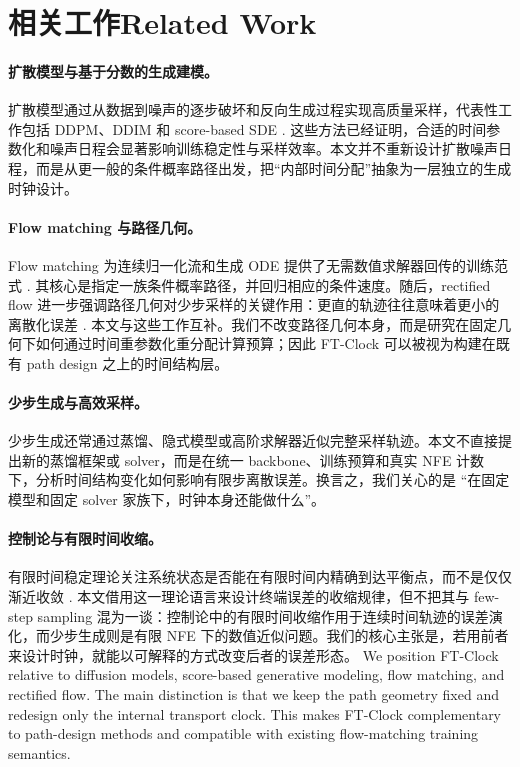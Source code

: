 \section{\ifinternalcn 相关工作\else Related Work\fi}

\ifinternalcn
\paragraph{扩散模型与基于分数的生成建模。}
扩散模型通过从数据到噪声的逐步破坏和反向生成过程实现高质量采样，代表性工作包括 DDPM、DDIM 和 score-based SDE \citep{ho2020ddpm,song2021ddim,song2021score}. 这些方法已经证明，合适的时间参数化和噪声日程会显著影响训练稳定性与采样效率。本文并不重新设计扩散噪声日程，而是从更一般的条件概率路径出发，把“内部时间分配”抽象为一层独立的生成时钟设计。

\paragraph{Flow matching 与路径几何。}
Flow matching 为连续归一化流和生成 ODE 提供了无需数值求解器回传的训练范式 \citep{lipman2023flowmatching}. 其核心是指定一族条件概率路径，并回归相应的条件速度。随后，rectified flow 进一步强调路径几何对少步采样的关键作用：更直的轨迹往往意味着更小的离散化误差 \citep{liu2022rectified}. 本文与这些工作互补。我们不改变路径几何本身，而是研究在固定几何下如何通过时间重参数化重分配计算预算；因此 FT-Clock 可以被视为构建在既有 path design 之上的时间结构层。

\paragraph{少步生成与高效采样。}
少步生成还常通过蒸馏、隐式模型或高阶求解器近似完整采样轨迹。本文不直接提出新的蒸馏框架或 solver，而是在统一 backbone、训练预算和真实 NFE 计数下，分析时间结构变化如何影响有限步离散误差。换言之，我们关心的是 ``在固定模型和固定 solver 家族下，时钟本身还能做什么''。

\paragraph{控制论与有限时间收缩。}
有限时间稳定理论关注系统状态是否能在有限时间内精确到达平衡点，而不是仅仅渐近收敛 \citep{bhat2000finite}. 本文借用这一理论语言来设计终端误差的收缩规律，但不把其与 few-step sampling 混为一谈：控制论中的有限时间收缩作用于连续时间轨迹的误差演化，而少步生成则是有限 NFE 下的数值近似问题。我们的核心主张是，若用前者来设计时钟，就能以可解释的方式改变后者的误差形态。
\else
We position FT-Clock relative to diffusion models, score-based generative modeling, flow matching, and rectified flow. The main distinction is that we keep the path geometry fixed and redesign only the internal transport clock. This makes FT-Clock complementary to path-design methods and compatible with existing flow-matching training semantics.
\fi
